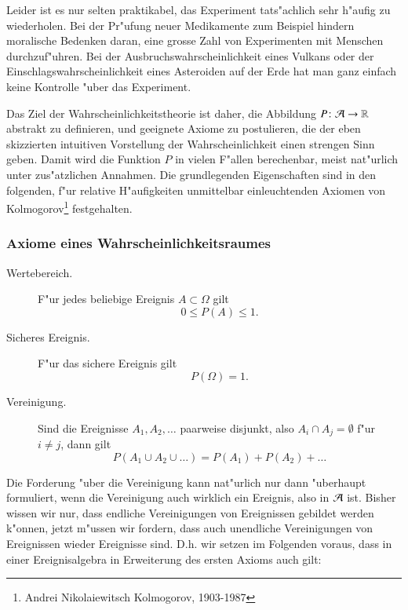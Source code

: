 Leider ist es nur selten praktikabel, das Experiment tats"achlich
sehr h"aufig zu wiederholen.  Bei der Pr"ufung neuer Medikamente
zum Beispiel hindern moralische Bedenken daran, eine grosse
Zahl von Experimenten mit Menschen durchzuf"uhren. Bei der
Ausbruchswahrscheinlichkeit eines Vulkans oder der
Einschlagswahrscheinlichkeit eines Asteroiden auf der Erde hat man
ganz einfach keine Kontrolle "uber das Experiment.

Das Ziel der Wahrscheinlichkeitstheorie ist daher, 
die Abbildung $P\colon {\cal A}\to\mathbb{R}$
abstrakt zu definieren, und geeignete Axiome zu postulieren, die
der eben skizzierten intuitiven Vorstellung der Wahrscheinlichkeit
einen strengen Sinn geben. Damit wird die Funktion $P$ in vielen
F"allen berechenbar, meist nat"urlich unter zus"atzlichen Annahmen.
Die grundlegenden Eigenschaften sind in den folgenden, f"ur
relative H"aufigkeiten unmittelbar einleuchtenden Axiomen
von Kolmogorov\footnote{Andrei Nikolaiewitsch Kolmogorov, 1903-1987}
festgehalten.

\subsubsection{Axiome  eines Wahrscheinlichkeitsraumes}

\begin{description}
\item[Wertebereich.]F"ur jedes beliebige Ereignis $A\subset \Omega$
gilt
\[
0\le P(A)\le 1.
\]
\item[Sicheres Ereignis.] F"ur das sichere Ereignis gilt
\[
P(\Omega) = 1.
\]
\item[Vereinigung.] Sind die Ereignisse $A_1,A_2,\dots$ paarweise
disjunkt, also $A_i\cap A_j=\emptyset$ f"ur $i\ne j$, dann gilt
\[
P(A_1\cup A_2\cup \dots) = P(A_1) + P(A_2) + \dots
\]
\end{description}

Die Forderung "uber die Vereinigung kann nat"urlich nur dann "uberhaupt
formuliert, wenn die Vereinigung auch wirklich ein Ereignis, also in
$\cal A$ ist. Bisher wissen wir nur, dass endliche
Vereinigungen von Ereignissen gebildet werden k"onnen, jetzt m"ussen
wir fordern, dass
auch unendliche Vereinigungen von Ereignissen wieder Ereignisse sind.
D.h. wir setzen im Folgenden voraus, dass in einer
Ereignisalgebra in Erweiterung des ersten Axioms auch gilt:

